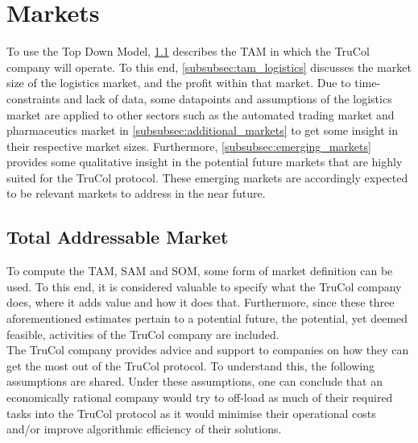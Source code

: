 \section{Markets}\label{sec:markets}


To use the Top Down Model, \cref{subsec:total_addressable_market} describes the TAM in which the TruCol company will operate. To this end, \cref{subsubsec:tam_logistics} discusses the market size of the logistics market, and the profit within that market. Due to time-constraints and lack of data, some datapoints and assumptions of the logistics market are applied to other sectors such as the automated trading market and pharmaceutics market in \cref{subsubsec:additional_markets} to get some insight in their respective market sizes. Furthermore, \cref{subsubsec:emerging_markets} provides some qualitative insight in the potential future markets that are highly suited for the TruCol protocol. These emerging markets are accordingly expected to be relevant markets to address in the near future.

\subsection{Total Addressable Market}\label{subsec:total_addressable_market}
To compute the TAM, SAM and SOM, some form of market definition can be used. To this end, it is considered valuable to specify what the TruCol company does, where it adds value and how it does that. Furthermore, since these three aforementioned estimates pertain to a potential future, the potential, yet deemed feasible, activities of the TruCol company are included.
\\
The TruCol company provides advice and support to companies on how they can get the most out of the TruCol protocol. To understand this, the following assumptions are shared. Under these assumptions, one can conclude that an economically rational company would try to off-load as much of their required tasks into the TruCol protocol as it would minimise their operational costs and/or improve algorithmic efficiency of their solutions.

